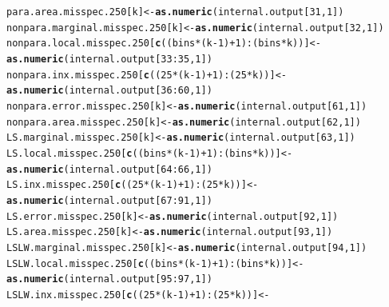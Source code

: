\documentclass[11pt]{article}\usepackage[]{graphicx}\usepackage[]{color}
\makeatletter
\newcommand{\hlnum}[1]{\textcolor[rgb]{0.686,0.059,0.569}{#1}}%
\newcommand{\hlopt}[1]{\textcolor[rgb]{0,0,0}{#1}}%
\newcommand{\hlstd}[1]{\textcolor[rgb]{0.345,0.345,0.345}{#1}}%
\newcommand{\hlkwb}[1]{\textcolor[rgb]{0.69,0.353,0.396}{#1}}%
\newcommand{\hlkwd}[1]{\textcolor[rgb]{0.737,0.353,0.396}{\textbf{#1}}}%
\newenvironment{kframe}{%
 \def\at@end@of@kframe{}%
 \ifinner\ifhmode%
  \def\at@end@of@kframe{\end{minipage}}%
  \begin{minipage}{\columnwidth}%
 \fi\fi%
 \def\FrameCommand##1{\hskip\@totalleftmargin \hskip-\fboxsep
 \colorbox{shadecolor}{##1}\hskip-\fboxsep
     \hskip-\linewidth \hskip-\@totalleftmargin \hskip\columnwidth}%
 \MakeFramed {\advance\hsize-\width
   \@totalleftmargin\z@ \linewidth\hsize
   \@setminipage}}%
 {\par\unskip\endMakeFramed%
 \at@end@of@kframe}
\newenvironment{knitrout}{}{} %
\makeatother
\begin{document}
\begin{knitrout}
\begin{kframe}
\begin{alltt}
  \hlstd{para.area.misspec.250[k]} \hlkwb{<-} \hlkwd{as.numeric}\hlstd{(internal.output[}\hlnum{31}\hlstd{,} \hlnum{1}\hlstd{])}
  \hlstd{nonpara.marginal.misspec.250[k]} \hlkwb{<-} \hlkwd{as.numeric}\hlstd{(internal.output[}\hlnum{32}\hlstd{,} \hlnum{1}\hlstd{])}
  \hlstd{nonpara.local.misspec.250[}\hlkwd{c}\hlstd{((bins}\hlopt{*}\hlstd{(k}\hlopt{-}\hlnum{1}\hlstd{)}\hlopt{+}\hlnum{1}\hlstd{)}\hlopt{:}\hlstd{(bins}\hlopt{*}\hlstd{k))]} \hlkwb{<-}
    \hlkwd{as.numeric}\hlstd{(internal.output[}\hlnum{33}\hlopt{:}\hlnum{35}\hlstd{,} \hlnum{1}\hlstd{])}
  \hlstd{nonpara.inx.misspec.250[}\hlkwd{c}\hlstd{((}\hlnum{25}\hlopt{*}\hlstd{(k}\hlopt{-}\hlnum{1}\hlstd{)}\hlopt{+}\hlnum{1}\hlstd{)}\hlopt{:}\hlstd{(}\hlnum{25}\hlopt{*}\hlstd{k))]} \hlkwb{<-}
    \hlkwd{as.numeric}\hlstd{(internal.output[}\hlnum{36}\hlopt{:}\hlnum{60}\hlstd{,} \hlnum{1}\hlstd{])}
  \hlstd{nonpara.error.misspec.250[k]} \hlkwb{<-} \hlkwd{as.numeric}\hlstd{(internal.output[}\hlnum{61}\hlstd{,} \hlnum{1}\hlstd{])}
  \hlstd{nonpara.area.misspec.250[k]} \hlkwb{<-} \hlkwd{as.numeric}\hlstd{(internal.output[}\hlnum{62}\hlstd{,} \hlnum{1}\hlstd{])}
  \hlstd{LS.marginal.misspec.250[k]} \hlkwb{<-} \hlkwd{as.numeric}\hlstd{(internal.output[}\hlnum{63}\hlstd{,} \hlnum{1}\hlstd{])}
  \hlstd{LS.local.misspec.250[}\hlkwd{c}\hlstd{((bins}\hlopt{*}\hlstd{(k}\hlopt{-}\hlnum{1}\hlstd{)}\hlopt{+}\hlnum{1}\hlstd{)}\hlopt{:}\hlstd{(bins}\hlopt{*}\hlstd{k))]} \hlkwb{<-}
    \hlkwd{as.numeric}\hlstd{(internal.output[}\hlnum{64}\hlopt{:}\hlnum{66}\hlstd{,} \hlnum{1}\hlstd{])}
  \hlstd{LS.inx.misspec.250[}\hlkwd{c}\hlstd{((}\hlnum{25}\hlopt{*}\hlstd{(k}\hlopt{-}\hlnum{1}\hlstd{)}\hlopt{+}\hlnum{1}\hlstd{)}\hlopt{:}\hlstd{(}\hlnum{25}\hlopt{*}\hlstd{k))]} \hlkwb{<-}
    \hlkwd{as.numeric}\hlstd{(internal.output[}\hlnum{67}\hlopt{:}\hlnum{91}\hlstd{,} \hlnum{1}\hlstd{])}
  \hlstd{LS.error.misspec.250[k]} \hlkwb{<-} \hlkwd{as.numeric}\hlstd{(internal.output[}\hlnum{92}\hlstd{,} \hlnum{1}\hlstd{])}
  \hlstd{LS.area.misspec.250[k]} \hlkwb{<-} \hlkwd{as.numeric}\hlstd{(internal.output[}\hlnum{93}\hlstd{,} \hlnum{1}\hlstd{])}
  \hlstd{LSLW.marginal.misspec.250[k]} \hlkwb{<-} \hlkwd{as.numeric}\hlstd{(internal.output[}\hlnum{94}\hlstd{,} \hlnum{1}\hlstd{])}
  \hlstd{LSLW.local.misspec.250[}\hlkwd{c}\hlstd{((bins}\hlopt{*}\hlstd{(k}\hlopt{-}\hlnum{1}\hlstd{)}\hlopt{+}\hlnum{1}\hlstd{)}\hlopt{:}\hlstd{(bins}\hlopt{*}\hlstd{k))]} \hlkwb{<-}
    \hlkwd{as.numeric}\hlstd{(internal.output[}\hlnum{95}\hlopt{:}\hlnum{97}\hlstd{,} \hlnum{1}\hlstd{])}
  \hlstd{LSLW.inx.misspec.250[}\hlkwd{c}\hlstd{((}\hlnum{25}\hlopt{*}\hlstd{(k}\hlopt{-}\hlnum{1}\hlstd{)}\hlopt{+}\hlnum{1}\hlstd{)}\hlopt{:}\hlstd{(}\hlnum{25}\hlopt{*}\hlstd{k))]} \hlkwb{<-}

\end{alltt}
\end{kframe}
\end{knitrout}
\end{document}
